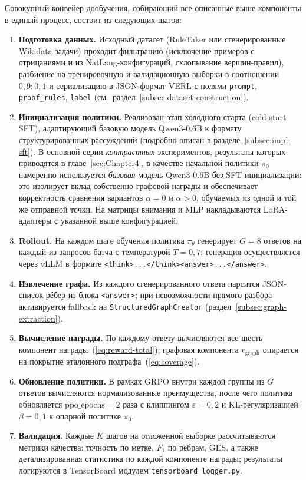 Совокупный конвейер дообучения, собирающий все описанные выше компоненты в единый процесс, состоит из следующих шагов:
\begin{enumerate}
    \setlength{\itemsep}{\smallskipamount}
    \item \textbf{Подготовка данных.} Исходный датасет (RuleTaker или сгенерированные Wikidata-задачи) проходит фильтрацию (исключение примеров с отрицаниями и из NatLang-конфигураций, схлопывание вершин-правил), разбиение на тренировочную и валидационную выборки в соотношении $0{,}9 : 0{,}1$ и сериализацию в JSON-формат VERL с полями \texttt{prompt}, \texttt{proof\_rules}, \texttt{label} (см.~раздел~\ref{subsec:dataset-construction}).
    \item \textbf{Инициализация политики.} Реализован этап холодного старта (cold-start SFT), адаптирующий базовую модель Qwen3-0.6B к формату структурированных рассуждений (подробно описан в разделе~\ref{subsec:impl-sft}). В основной серии \emph{контрастных} экспериментов, результаты которых приводятся в главе~\ref{sec:Chapter4}, в качестве начальной политики $\pi_0$ намеренно используется \emph{базовая} модель Qwen3-0.6B без SFT-инициализации: это изолирует вклад собственно графовой награды и обеспечивает корректность сравнения вариантов $\alpha = 0$ и $\alpha > 0$, обучаемых из одной и той же отправной точки. На матрицы внимания и MLP накладываются LoRA-адаптеры с указанной выше конфигурацией.
    \item \textbf{Rollout.} На каждом шаге обучения политика $\pi_\theta$ генерирует $G = 8$ ответов на каждый из запросов батча с температурой $T = 0{,}7$; генерация осуществляется через vLLM в формате \texttt{<think>...</think><answer>...</answer>}.
    \item \textbf{Извлечение графа.} Из каждого сгенерированного ответа парсится JSON-список рёбер из блока \texttt{<answer>}; при невозможности прямого разбора активируется fallback на \texttt{StructuredGraphCreator} (раздел~\ref{subsec:graph-extraction}).
    \item \textbf{Вычисление награды.} По каждому ответу вычисляются все шесть компонент награды~(\ref{eq:reward-total}); графовая компонента $r_{\text{graph}}$ опирается на покрытие эталонного подграфа~(\ref{eq:coverage}).
    \item \textbf{Обновление политики.} В рамках GRPO внутри каждой группы из $G$ ответов вычисляются нормализованные преимущества, после чего политика обновляется $\text{ppo\_epochs} = 2$ раза с клиппингом $\varepsilon = 0{,}2$ и KL-регуляризацией $\beta = 0{,}1$ к опорной политике $\pi_0$.
    \item \textbf{Валидация.} Каждые $K$ шагов на отложенной выборке рассчитываются метрики качества: точность по метке, $F_1$ по рёбрам, GES, а также детализированная статистика по каждой компоненте награды; результаты логируются в TensorBoard модулем \texttt{tensorboard\_logger.py}.
\end{enumerate}

